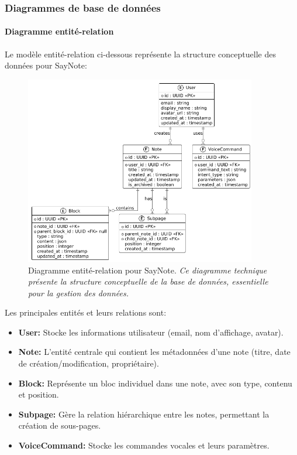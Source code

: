     \subsubsection{Diagrammes de base de données}
    
    \paragraph{Diagramme entité-relation}
    
    Le modèle entité-relation ci-dessous représente la structure conceptuelle des données pour SayNote:
    
        \begin{figure}[htbp]
        \centering
        \includegraphics[width=0.9\textwidth]{assets/docs/SayNote_er_diagram.png}
        \caption{Diagramme entité-relation pour SayNote. \newline\textit{Ce diagramme technique présente la structure conceptuelle de la base de données, essentielle pour la gestion des données.}}
        \label{fig:er_diagram}
    \end{figure}
    
    Les principales entités et leurs relations sont:
    
    \begin{itemize}
        \item \textbf{User:} Stocke les informations utilisateur (email, nom d'affichage, avatar).
        
        \item \textbf{Note:} L'entité centrale qui contient les métadonnées d'une note (titre, date de création/modification, propriétaire).
        
        \item \textbf{Block:} Représente un bloc individuel dans une note, avec son type, contenu et position.
        
        \item \textbf{Subpage:} Gère la relation hiérarchique entre les notes, permettant la création de sous-pages.
        
        \item \textbf{VoiceCommand:} Stocke les commandes vocales et leurs paramètres.
    \end{itemize}
    
